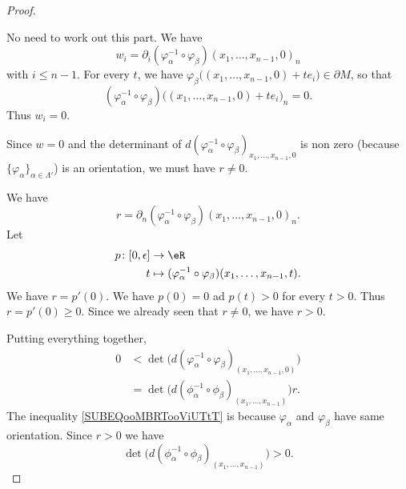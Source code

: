 \begin{proof}
\begin{subproof}
		\spitem[Part \( v\)]
		No need to work out this part.
		\spitem[Part \( w\)]
		We have
		\begin{equation}
			w_i=\partial_i(\varphi_{\alpha}^{-1}\circ\varphi_{\beta})(x_1,\ldots,x_{n-1}, 0)_n
		\end{equation}
		with \( i\leq n-1\). For every \( t\), we have \( \varphi_{\beta}\big( (x_1,\ldots,x_{n-1},0)+te_i \big)\in \partial M\), so that
		\begin{equation}
			( \varphi_{\alpha}^{-1} \circ\varphi_{\beta})\big( (x_1,\ldots,x_{n-1},0)+te_i \big)_n=0.
		\end{equation}
		Thus \( w_i=0\).

		\spitem[Part \( r\)]
		Since \( w=0\) and the determinant of \( d(\varphi_{\alpha}^{-1}\circ\varphi_{\beta})_{x_1,\ldots,x_{n-1},0} \) is non zero (because \( \{ \varphi_{\alpha} \}_{\alpha\in \Lambda'}\)) is an orientation, we must have \( r\neq 0\).

		We have
		\begin{equation}
			r=\partial_n(\varphi_{\alpha}^{-1}\circ\varphi_{\beta})(x_1,\ldots,x_{n-1}, 0)_n.
		\end{equation}
		Let
		\begin{equation}
			\begin{aligned}
				p\colon \mathopen[ 0,\epsilon\mathclose] & \to \eR                                                                    \\
				t                                        & \mapsto (\varphi_{\alpha}^{-1}\circ\varphi_{\beta})(x_1,\ldots,x_{n-1},t).
			\end{aligned}
		\end{equation}
		We have \( r=p'(0)\). We have \( p(0)=0\) ad \( p(t)>0\) for every \( t>0\). Thus \(  r=p'(0)\geq 0\). Since we already seen that \( r\neq 0\), we have \( r>0\).
	\end{subproof}
	Putting everything together,
	\begin{subequations}
		\begin{align}
			0 & < \det\big( d(\varphi_{\alpha}^{-1}\circ \varphi_{\beta})_{(x_1,\ldots,x_{n-1}, 0)} \big)			\label{SUBEQooMBRTooViUTtT} \\
			  & =\det\big( d(\phi_{\alpha}^{-1}\circ\phi_{\beta})_{(x_1,\ldots,x_{n-1})} \big)r.
		\end{align}
	\end{subequations}
	The inequality \eqref{SUBEQooMBRTooViUTtT} is because \( \varphi_{\alpha}\) and \( \varphi_{\beta}\) have same orientation. Since \( r>0 \) we have
	\begin{equation}
		\det\big( d(\phi_{\alpha}^{-1}\circ\phi_{\beta})_{(x_1,\ldots,x_{n-1})} \big)>0.
	\end{equation}
\end{proof}

